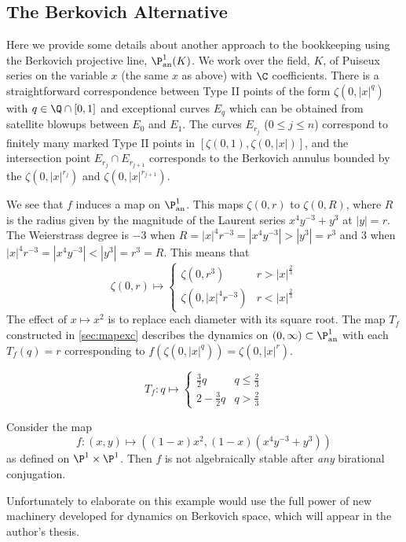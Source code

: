 \documentclass[11pt, final]{amsart}
\begin{document}

\subsection{The Berkovich Alternative}\label{sec:berkalt}
Here we provide some details about another approach to the bookkeeping using the Berkovich projective line, $\P^1_\text{an}(K)$. We work over the field, $K$, of Puiseux series on the variable $x$ (the same $x$ as above) with $\C$ coefficients. There is a straightforward correspondence between Type II points of the form $\zeta(0, |x|^q)$ with $q \in \Q\cap[0, 1]$ and exceptional curves $E_q$ which can be obtained from satellite blowups between $E_0$ and $E_1$. The curves $E_{r_j}$ ($0 \le j \le n$) correspond to finitely many marked Type II points in $[\zeta(0, 1), \zeta(0, |x|)]$, and the intersection point $E_{r_j}\cap E_{r_{j+1}}$ corresponds to the Berkovich annulus bounded by the $\zeta(0, |x|^{r_j})$ and $\zeta(0, |x|^{r_{j+1}})$.

We see that $f$ induces a map on $\P^1_\text{an}$. This maps $\zeta(0, r)$ to $\zeta(0, R)$, where $R$ is the radius given by the magnitude of the Laurent series $x^4y^{-3} + y^3$ at $|y| = r$. The Weierstrass degree is $-3$ when $R = |x|^4r^{-3} = |x^4y^{-3}| > |y^3| = r^3$ and $3$ when $|x|^4r^{-3} = |x^4y^{-3}| < |y^3| = r^3 = R$. This means that
 \[\zeta(0, r) \longmapsto 
\begin{cases}
 \zeta(0, r^3) & r > |x|^{\frac 23}\\
 \zeta(0, |x|^4r^{-3}) & r < |x|^{\frac 23}
\end{cases}
\]
The effect of $x \mapsto x^2$ is to replace each diameter with its square root. The map $T_f$ constructed in \autoref{sec:mapexc} describes the dynamics on $(0, \infty) \subset \P^1_\text{an}$ with each $T_f(q) = r$ corresponding to $f(\zeta(0, |x|^q)) = \zeta(0, |x|^r)$.

\[T_f : q \longmapsto 
\begin{cases}
 \frac {3}{2}q & q \le \frac 23\\
 2 - \frac {3}{2}q & q > \frac 23
\end{cases}
\]

\begin{ex}
 Consider the map \[f : (x, y) \longmapsto \left((1-x)x^2, (1-x)(x^4y^{-3} + y^3)\right)\] as defined on $\P^1 \times \P^1$. Then $f$ is not algebraically stable after \emph{any} birational conjugation.
 
 Unfortunately to elaborate on this example would use the full power of new machinery developed for dynamics on Berkovich space, which will appear in the author's thesis.
\end{ex}



\end{document}
